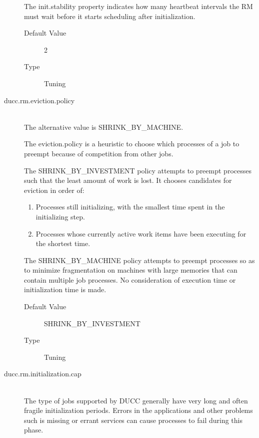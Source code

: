 \begin{description}
          The init.stability property indicates how many heartbeat intervals the RM must wait before 
          it starts scheduling after initialization. 
          \begin{description}            
            \item[Default Value] 2
            \item[Type] Tuning 
          \end{description}
          
        \item[ducc.rm.eviction.policy] \hfill \\
          The alternative value is SHRINK\_BY\_MACHINE. 

          The eviction.policy is a heuristic to choose which processes of a job to preempt because of 
          competition from other jobs. 
          
          The SHRINK\_BY\_INVESTMENT policy attempts to preempt processes such that the           
          least amount of work is lost. It chooses candidates for eviction in order of: 
          \begin{enumerate}
            \item Processes still initializing, with the smallest time spent in the initializing step. 
            \item Processes whose currently active work items have been executing for the shortest 
              time.
            \end{enumerate}
            The SHRINK\_BY\_MACHINE policy attempts to preempt processes so as to minimize 
            fragmentation on machines with large memories that can contain multiple job processes. 
            No consideration of execution time or initialization time is made.             
          \begin{description}
            \item[Default Value] SHRINK\_BY\_INVESTMENT 
            \item[Type] Tuning 
          \end{description}
          

        \item[ducc.rm.initialization.cap] \hfill \\
          The type of jobs supported by DUCC generally have very long and often fragile 
          initialization periods. Errors in the applications and other problems such is missing or 
          errant services can cause processes to fail during this phase. 
          

\end{description}
